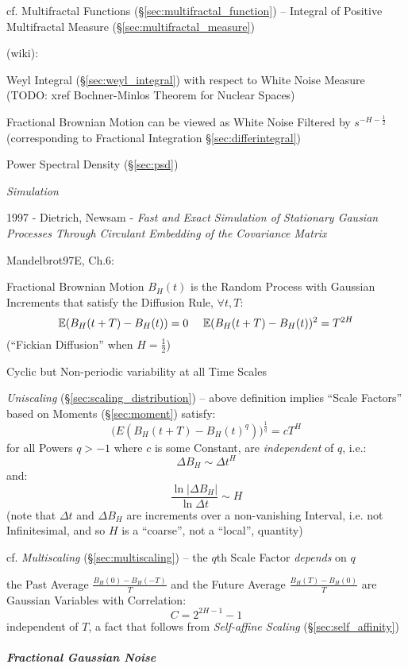 cf. Multifractal Functions (\S\ref{sec:multifractal_function}) -- Integral of
Positive Multifractal Measure (\S\ref{sec:multifractal_measure})

(wiki):

Weyl Integral (\S\ref{sec:weyl_integral}) with respect to White Noise Measure
(TODO: xref Bochner-Minlos Theorem for Nuclear Spaces)

Fractional Brownian Motion can be viewed as White Noise Filtered by
$s^{-H-\frac{1}{2}}$ (corresponding to Fractional Integration
\S\ref{sec:differintegral})

Power Spectral Density (\S\ref{sec:psd})

\emph{Simulation}

1997 - Dietrich, Newsam - \emph{Fast and Exact Simulation of Stationary Gausian
  Processes Through Circulant Embedding of the Covariance Matrix}

Mandelbrot97E, Ch.6:

Fractional Brownian Motion $B_H(t)$ is the Random Process with Gaussian
Increments that satisfy the Diffusion Rule, $\forall t, T$:
\[
  \expect(B_H(t+T) - B_H(t)) = 0 \ \ \ \ \expect(B_H(t+T) - B_H(t))^2 = T^{2H}
\]
(``Fickian Diffusion'' when $H = \frac{1}{2}$)

Cyclic but Non-periodic variability at all Time Scales

\emph{Uniscaling} (\S\ref{sec:scaling_distribution}) -- above definition implies
``Scale Factors'' based on Moments (\S\ref{sec:moment}) satisfy:
\[
  \Big(E(B_H(t + T) - B_H(t)^q)\Big)^{\frac{1}{q}} = c T^H
\]
for all Powers $q > -1$ where $c$ is some Constant, are \emph{independent} of
$q$, i.e.:
\[
  \Delta B_H \sim \Delta t^H
\]
and:
\[
  \frac{\ln|\Delta B_H|}{\ln \Delta{t}} \sim H
\]
(note that $\Delta t$ and $\Delta B_H$ are increments over a non-vanishing
Interval, i.e. not Infinitesimal, and so $H$ is a ``coarse'', not a ``local'',
quantity)

cf. \emph{Multiscaling} (\S\ref{sec:multiscaling}) -- the $q$th Scale Factor
\emph{depends} on $q$

the Past Average $\frac{B_H(0) - B_H(-T)}{T}$ and the Future Average
$\frac{B_H(T) - B_H(0)}{T}$ are Gaussian Variables with Correlation:
\[
  C = 2^{2H-1} - 1
\]
independent of $T$, a fact that follows from \emph{Self-affine Scaling}
(\S\ref{sec:self_affinity})



\subparagraph{Fractional Gaussian Noise}\label{sec:fractional_gaussian}\hfill

